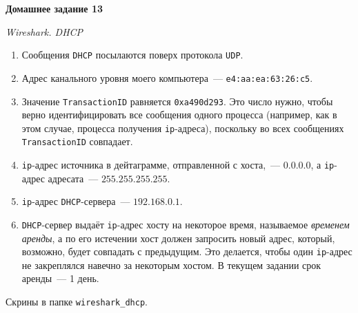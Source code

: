 \documentclass[12pt]{article}
\def\THEME{Домашнее задание 13}
\begin{document}
\begin{center}
\vspace*{0mm}
{\LARGE \bf \THEME}
\end{center}

\begin{center}
{\Large \it Wireshark. DHCP}
\end{center}

\begin{enumerate}

\item Сообщения \texttt{DHCP} посылаются поверх протокола \texttt{UDP}.

\item Адрес канального уровня моего компьютера~--- \texttt{e4:aa:ea:63:26:c5}.

\item Значение \texttt{TransactionID} равняется \texttt{0xa490d293}. Это число нужно, чтобы верно идентифицировать все сообщения одного процесса (например, как в этом случае, процесса получения \texttt{ip}-адреса), поскольку во всех сообщениях \texttt{TransactionID} совпадает.

\item \texttt{ip}-адрес источника в дейтаграмме, отправленной с хоста,~--- $0.0.0.0$, а \texttt{ip}-адрес адресата~--- $255.255.255.255$.

\item \texttt{ip}-адрес \texttt{DHCP}-сервера~--- $192.168.0.1$.

\item \texttt{DHCP}-сервер выдаёт \texttt{ip}-адрес хосту на некоторое время, называемое \textit{временем аренды}, а по его истечении хост должен запросить новый адрес, который, возможно, будет совпадать с предыдущим. Это делается, чтобы один \texttt{ip}-адрес не закреплялся навечно за некоторым хостом. В текущем задании срок аренды~--- 1 день.

\end{enumerate}

Скрины в папке \texttt{wireshark\_dhcp}.
\end{document}
